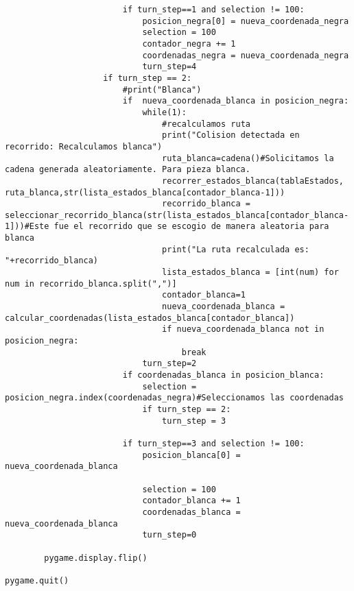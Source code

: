 \begin{lstlisting}
                        if turn_step==1 and selection != 100:
                            posicion_negra[0] = nueva_coordenada_negra
                            selection = 100
                            contador_negra += 1
                            coordenadas_negra = nueva_coordenada_negra
                            turn_step=4
                    if turn_step == 2:
                        #print("Blanca")
                        if  nueva_coordenada_blanca in posicion_negra:
                            while(1):
                                #recalculamos ruta
                                print("Colision detectada en recorrido: Recalculamos blanca")
                                ruta_blanca=cadena()#Solicitamos la cadena generada aleatoriamente. Para pieza blanca.
                                recorrer_estados_blanca(tablaEstados, ruta_blanca,str(lista_estados_blanca[contador_blanca-1]))
                                recorrido_blanca = seleccionar_recorrido_blanca(str(lista_estados_blanca[contador_blanca-1]))#Este fue el recorrido que se escogio de manera aleatoria para blanca
                                print("La ruta recalculada es: "+recorrido_blanca)
                                lista_estados_blanca = [int(num) for num in recorrido_blanca.split(",")]
                                contador_blanca=1
                                nueva_coordenada_blanca = calcular_coordenadas(lista_estados_blanca[contador_blanca])
                                if nueva_coordenada_blanca not in posicion_negra:
                                    break
                            turn_step=2
                        if coordenadas_blanca in posicion_blanca:
                            selection = posicion_negra.index(coordenadas_negra)#Seleccionamos las coordenadas
                            if turn_step == 2:
                                turn_step = 3
                            
                        if turn_step==3 and selection != 100:
                            posicion_blanca[0] = nueva_coordenada_blanca
                            
                            selection = 100
                            contador_blanca += 1
                            coordenadas_blanca = nueva_coordenada_blanca
                            turn_step=0

        pygame.display.flip()

pygame.quit()


\end{lstlisting}


